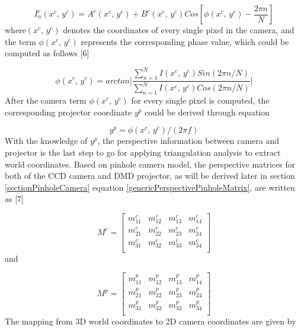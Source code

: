  \begin{equation}
%
I^c_n(x^c, \, y^c) %
= A^c(x^c, \, y^c) + B^c(x^c, \, y^c)Cos[\phi(x^c,\, y^c) - \frac{2\pi n}{N}]
%
\end{equation}%
%
where\((x^c, \, y^c)\) denotes the coordinates of every single pixel in the camera, and the term \(\phi(x^c,\, y^c)\) represents the corresponding phase value, which could be computed as follows [6]\par
 \begin{equation}
%
\phi(x^c,\, y^c) %
= arctan\Bigg[\frac{\sum^N_{n=1}I(x^c,\,y^c)Sin(2\pi n / N)}{\sum^N_{n=1}I(x^c,\,y^c)Cos(2\pi n / N)} \Bigg]
%
\label{equationArctangent}
\end{equation}
%
%
After the camera term  \(\phi(x^c,\, y^c)\)  for every single pixel is computed, the corresponding projector coordinate \(y^p\) could be derived through equation\par

\begin{equation}
%
y^p %
= \phi(x^c,\, y^c) / (2\pi f)
%
\end{equation}%
%
With the knowledge of \(y^p\), the perspective information between camera and projector is the last step to go for applying triangulation analysis to extract world coordinates. Based on pinhole camera model, the perspective matrices for both of the CCD camera and DMD projector, as will be derived later in section \ref{sectionPinholeCamera} equation \ref{genericPerspectivePinholeMatrix}, are written as [7]\par

\begin{equation}
%
M^c %
= \begin{bmatrix} 
m^c_{11} & m^c_{12} & m^c_{13} & m^c_{14} \\
m^c_{21} & m^c_{22} & m^c_{23} & m^c_{24} \\
m^c_{31} & m^c_{32} & m^c_{33} & m^c_{34} \\
\end{bmatrix}%
%
\end{equation}%
%
and 

\begin{equation}
%
M^p %
= \begin{bmatrix} 
m^p_{11} & m^p_{12} & m^p_{13} & m^p_{14} \\
m^p_{21} & m^p_{22} & m^p_{23} & m^p_{24} \\
m^p_{31} & m^p_{32} & m^p_{33} & m^p_{34} \\
\end{bmatrix}%
%
\end{equation}%
%
The mapping from 3D world coordinates to 2D camera coordinates are given by\par

